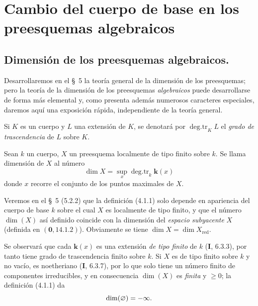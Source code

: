 \section{Cambio del cuerpo de base en los preesquemas algebraicos}
\label{IV.2.4-fr}

\subsection{Dimensión de los preesquemas algebraicos.}
\label{subsection:IV.2.4.1-fr}

Desarrollaremos en el \S~5 la teoría general de la dimensión de los
preesquemas; pero la teoría de la dimensión de los preesquemas
\emph{algebraicos} puede desarrollarse de forma más elemental y, como presenta
además numerosos caracteres especiales, daremos aquí una exposición rápida,
independiente de la teoría general.

Si $K$ es un cuerpo y $L$ una extensión de $K$, se denotará por
$\operatorname{deg.tr}_K L$ el \emph{grado de trascendencia} de $L$ sobre $K$.

\begin{definition}[4.1.1]
\label{IV.2.4.1.1-fr}
Sean $k$ un cuerpo, $X$ un preesquema localmente de tipo finito sobre $k$. Se
llama dimensión de $X$ al número
\begin{equation}
\tag{4.1.1.1}
\label{IV.2.4.1.1.1-fr}
\dim X=\sup_x\operatorname{deg.tr}_k \boldsymbol{k}(x)
\end{equation}
donde $x$ recorre el conjunto de los puntos maximales de $X$.
\end{definition}

Veremos en el \S~5 (5.2.2) que la definición (4.1.1) solo depende en
apariencia del cuerpo de base $k$ sobre el cual $X$ es localmente de tipo
finito, y que el número $\dim(X)$ así definido coincide con la dimensión del
\emph{espacio subyacente} $X$ (definida en $(\mathbf{0},14.1.2)$). Obviamente se tiene
$\dim X=\dim X_{\mathrm{red}}$.

Se observará que cada $\boldsymbol{k}(x)$ es una extensión \emph{de tipo finito} de $k$
(\textbf I, 6.3.3), por tanto tiene grado de trascendencia finito sobre $k$. Si $X$ es
de tipo finito sobre $k$ y no vacío, es noetheriano (\textbf I, 6.3.7), por lo que solo
tiene un número finito de componentes irreducibles, y en consecuencia
$\dim(X)$ es \emph{finita} y $\geqslant0$; la definición (4.1.1) da
\[
\dim(\varnothing)=-\infty.
\]

